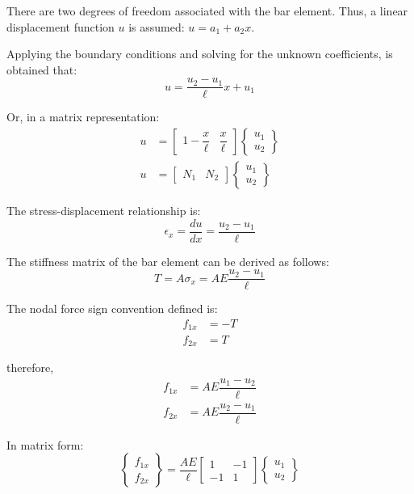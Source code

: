 There are two degrees of freedom associated with the bar element. Thus, a linear displacement function $u$ is assumed: $u = a_1 + a_2 x$.

Applying the boundary conditions and solving for the unknown coefficients, is obtained that:
%
\begin{equation}
    u = \dfrac{u_2 - u_1}{\ell} x + u_1
\end{equation}

Or, in a matrix representation:
%
\begin{align}
    u &= \begin{bmatrix} 1 - \dfrac{x}{\ell} & \dfrac{x}{\ell}  \end{bmatrix} \begin{Bmatrix} u_1 \\ u_2 \end{Bmatrix} \\
    u &= \begin{bmatrix} N_1 & N_2 \end{bmatrix} \begin{Bmatrix} u_1 \\ u_2 \end{Bmatrix}
\end{align}

The stress-displacement relationship is:
%
\begin{equation}
    \epsilon_x = \dfrac{du}{dx} = \dfrac{u_2 - u_1}{\ell}
\end{equation}

The stiffness matrix of the bar element can be derived as follows:
%
\begin{equation}
    T = A \sigma_x = AE\dfrac{u_2 - u_1}{\ell}
\end{equation}

The nodal force sign convention defined is:
%
\begin{align}
    f_{1x} &= -T \\
    f_{2x} &= T
\end{align}

therefore,
%
\begin{align}
    f_{1x} &= AE\dfrac{u_1 - u_2}{\ell} \\
    f_{2x} &= AE\dfrac{u_2 - u_1}{\ell}
\end{align}

In matrix form:
%
\begin{equation}
    \begin{Bmatrix} f_{1x} \\ f_{2x} \end{Bmatrix} = \dfrac{AE}{\ell} \begin{bmatrix} 1 & -1 \\ -1 & 1 \end{bmatrix} \begin{Bmatrix} u_1 \\ u_2 \end{Bmatrix}
\end{equation}

